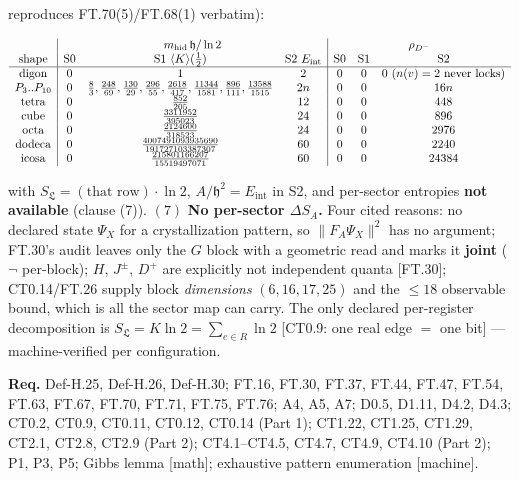 \begin{theorem}
reproduces FT.70(5)/FT.68(1) verbatim):

\[
\begin{array}{c|ccc|ccc}
& \multicolumn3{c|}{m_{\mathrm{hid}}\,\mathfrak h/\ln2} & \multicolumn3{c}{\rho_{D^-}}\\
\text{shape} & \text{S0} & \text{S1}\ \langle K\rangle(\tfrac12) & \text{S2}\ E_{\mathrm{int}} & \text{S0} & \text{S1} & \text{S2}\\
\hline
\text{digon} & 0 & 1 & 2 & 0 & 0 & 0\ (n(v)=2\ \text{never locks})\\
P_3..P_{10} & 0 & \tfrac83,\tfrac{248}{69},\tfrac{130}{29},\tfrac{296}{55},\tfrac{2618}{417},\tfrac{11344}{1581},\tfrac{896}{111},\tfrac{13588}{1515} & 2n & 0 & 0 & 16n\\
\text{tetra} & 0 & \tfrac{852}{205} & 12 & 0 & 0 & 448\\
\text{cube} & 0 & \tfrac{3311952}{395023} & 24 & 0 & 0 & 896\\
\text{octa} & 0 & \tfrac{2124600}{318523} & 24 & 0 & 0 & 2976\\
\text{dodeca} & 0 & \tfrac{4007491093935690}{191727103387307} & 60 & 0 & 0 & 2240\\
\text{icosa} & 0 & \tfrac{215801166207}{15519497071} & 60 & 0 & 0 & 24384
\end{array}
\]

with $S_{\mathfrak L}=(\text{that row})\cdot\ln2$, $A/\mathfrak h^2=E_{\mathrm{int}}$ in S2, and per-sector entropies \textbf{not available} (clause (7)). $(7)$ \textbf{No per-sector $\Delta S_A$.} Four cited reasons: no declared state $\Psi_X$ for a crystallization pattern, so $\|F_A\Psi_X\|^2$ has no argument; FT.30's audit leaves only the $G$ block with a geometric read and marks it \textbf{joint} ($\neg$ per-block); $H$, $J^\pm$, $D^+$ are explicitly not independent quanta [FT.30]; CT0.14/FT.26 supply block \textit{dimensions} $(6,16,17,25)$ and the $\le18$ observable bound, which is all the sector map can carry. The only declared per-register decomposition is $S_{\mathfrak L}=K\ln2=\sum_{e\in R}\ln2$ [CT0.9: one real edge $=$ one bit] — machine-verified per configuration.

\textbf{Req.} Def-H.25, Def-H.26, Def-H.30; FT.16, FT.30, FT.37, FT.44, FT.47, FT.54, FT.63, FT.67, FT.70, FT.71, FT.75, FT.76; A4, A5, A7; D0.5, D1.11, D4.2, D4.3; CT0.2, CT0.9, CT0.11, CT0.12, CT0.14 (Part 1); CT1.22, CT1.25, CT1.29, CT2.1, CT2.8, CT2.9 (Part 2); CT4.1–CT4.5, CT4.7, CT4.9, CT4.10 (Part 2); P1, P3, P5; Gibbs lemma [math]; exhaustive pattern enumeration [machine].


\end{theorem}
